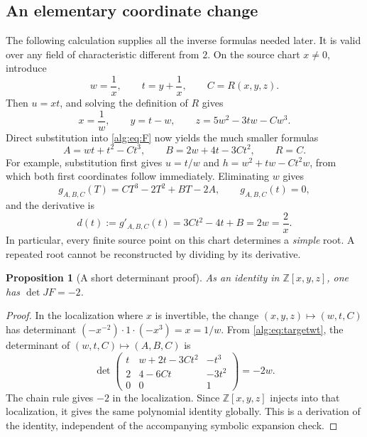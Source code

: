 \documentclass[11pt]{article}
\numberwithin{equation}{section}
\theoremstyle{plain}
\newtheorem{proposition}[proposition]{Proposition}
\theoremstyle{plain}
\theoremstyle{plain}
\theoremstyle{definition}
\theoremstyle{definition}
\theoremstyle{definition}
\theoremstyle{remark}
\newcommand{\Z}{\mathbb Z}\newcommand{\Q}{\mathbb Q}
\begin{document}
\subsection{An elementary coordinate change}
The following calculation supplies all the inverse formulas needed later.
It is valid over any field of characteristic different from $2$.
On the source chart $x\ne0$, introduce
\begin{equation}\label{alg:eq:wt}
w=\frac1x,\qquad t=y+\frac1x,\qquad C=R(x,y,z).
\end{equation}
Then $u=xt$, and solving the definition of $R$ gives
\begin{equation}\label{alg:eq:sourcewt}
x=\frac1w,\qquad y=t-w,\qquad
z=5w^2-3tw-Cw^3.
\end{equation}
Direct substitution into \eqref{alg:eq:F} now yields the much smaller formulas
\begin{equation}\label{alg:eq:targetwt}
 A=wt+t^2-Ct^3,\qquad B=2w+4t-3Ct^2,\qquad R=C.
\end{equation}
For example, substitution first gives $u=t/w$ and
$h=w^2+tw-Ct^2w$, from which both first coordinates follow immediately.
Eliminating $w$ gives
\begin{equation}\label{alg:eq:inversecubic}
g_{A,B,C}(T)=CT^3-2T^2+BT-2A,
\qquad g_{A,B,C}(t)=0,
\end{equation}
and the derivative is
\begin{equation}\label{alg:eq:derivative}
d(t):=g'_{A,B,C}(t)=3Ct^2-4t+B=2w=\frac2x.
\end{equation}
In particular, every finite source point on this chart determines a
\emph{simple} root. A repeated root cannot be reconstructed by dividing
by its derivative.

\begin{proposition}[A short determinant proof]\label{alg:prop:jacobian}
As an identity in $\Z[x,y,z]$, one has $\det JF=-2$.
\end{proposition}
\begin{proof}
In the localization where $x$ is invertible, the change
$(x,y,z)\mapsto(w,t,C)$ has determinant
$(-x^{-2})\cdot1\cdot(-x^3)=x=1/w$.
From \eqref{alg:eq:targetwt}, the determinant of
$(w,t,C)\mapsto(A,B,C)$ is
\[
\det\begin{pmatrix}
t&w+2t-3Ct^2&-t^3\\
2&4-6Ct&-3t^2\\
0&0&1
\end{pmatrix}=-2w.
\]
The chain rule gives $-2$ in the localization. Since $\Z[x,y,z]$
injects into that localization, it gives the same polynomial identity
globally. This is a derivation of the identity, independent of the
accompanying symbolic expansion check.
\end{proof}
\end{document}
